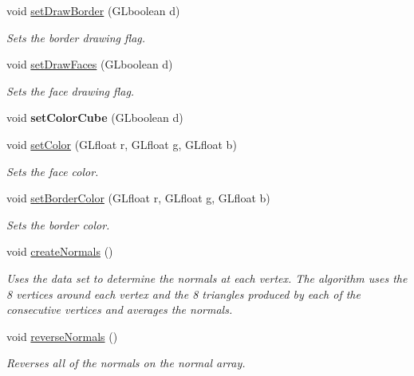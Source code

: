 \begin{DoxyCompactItemize}
void \hyperlink{class_models_adeedf0eee4b0d37e98b6d829b2e71603}{set\+Draw\+Border} (G\+Lboolean d)
\begin{DoxyCompactList}\small\item\em Sets the border drawing flag. \end{DoxyCompactList}\item 
void \hyperlink{class_models_abbc31fff246bd46bc2bfc38571549a4e}{set\+Draw\+Faces} (G\+Lboolean d)
\begin{DoxyCompactList}\small\item\em Sets the face drawing flag. \end{DoxyCompactList}\item 
\mbox{\label{class_models_a9a80a903200981fac7abffab9dd3efe1}} 
void {\bfseries set\+Color\+Cube} (G\+Lboolean d)
\item 
void \hyperlink{class_models_a670367b44d29eb20dff40ad475f071c7}{set\+Color} (G\+Lfloat r, G\+Lfloat g, G\+Lfloat b)
\begin{DoxyCompactList}\small\item\em Sets the face color. \end{DoxyCompactList}\item 
void \hyperlink{class_models_ac4adff6206ead1a88b9e443be33cfc54}{set\+Border\+Color} (G\+Lfloat r, G\+Lfloat g, G\+Lfloat b)
\begin{DoxyCompactList}\small\item\em Sets the border color. \end{DoxyCompactList}\item 
\mbox{\label{class_models_abd75acf49362833593d8ced9c98c7358}} 
void \hyperlink{class_models_abd75acf49362833593d8ced9c98c7358}{create\+Normals} ()
\begin{DoxyCompactList}\small\item\em Uses the data set to determine the normals at each vertex. The algorithm uses the 8 vertices around each vertex and the 8 triangles produced by each of the consecutive vertices and averages the normals. \end{DoxyCompactList}\item 
\mbox{\label{class_models_ad4bdadc9465206d334f0cf2df69dcf40}} 
void \hyperlink{class_models_ad4bdadc9465206d334f0cf2df69dcf40}{reverse\+Normals} ()
\begin{DoxyCompactList}\small\item\em Reverses all of the normals on the normal array. \end{DoxyCompactList}\item 

\end{DoxyCompactItemize}
